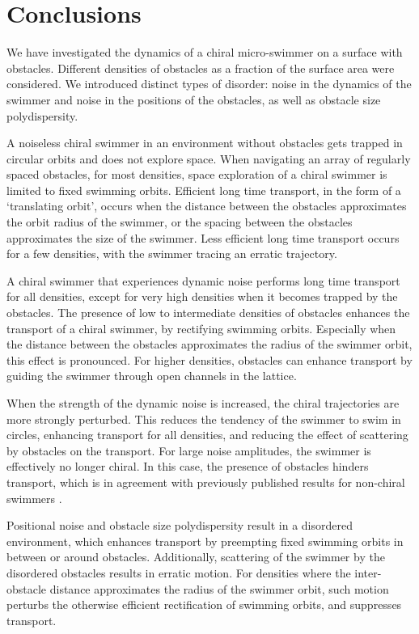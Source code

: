 \documentclass[aps,pre,twocolumn,showpacs,superscriptaddress,amsmath,amssymb,longbibliography]{revtex4-2}
\begin{document}
\section{Conclusions}
We have investigated the dynamics of a chiral micro-swimmer on a surface with obstacles. Different densities of obstacles as a fraction of the surface area were considered. We introduced distinct types of disorder: noise in the dynamics of the swimmer and noise in the positions of the obstacles, as well as obstacle size polydispersity. 

A noiseless chiral swimmer in an environment without obstacles gets trapped in circular orbits and does not explore space. When navigating an array of regularly spaced obstacles, for most densities, space exploration of a chiral swimmer is limited to fixed swimming orbits. Efficient long time transport, in the form of a `translating orbit', occurs when the distance between the obstacles approximates the orbit radius of the swimmer, or the spacing between the obstacles approximates the size of the swimmer. Less efficient long time transport occurs for a few densities, with the swimmer tracing an erratic trajectory.

A chiral swimmer that experiences dynamic noise performs long time transport for all densities, except for very high densities when it becomes trapped by the obstacles. The presence of low to intermediate densities of obstacles enhances the transport of a chiral swimmer, by rectifying swimming orbits. Especially when the distance between the obstacles approximates the radius of the swimmer orbit, this effect is pronounced. For higher densities, obstacles can enhance transport by guiding the swimmer through open channels in the lattice. 

When the strength of the dynamic noise is increased, the chiral trajectories are more strongly perturbed. This reduces the tendency of the swimmer to swim in circles, enhancing transport for all densities, and reducing the effect of scattering by obstacles on the transport. For large noise amplitudes, the swimmer is effectively no longer chiral. In this case, the presence of obstacles hinders transport, which is in agreement with previously published results for non-chiral swimmers \cite{experiments1, lorentzgas}. 

Positional noise and obstacle size polydispersity result in a disordered environment, which enhances transport by preempting fixed swimming orbits in between or around obstacles. Additionally, scattering of the swimmer by the disordered obstacles results in erratic motion. For densities where the inter-obstacle distance approximates the radius of the swimmer orbit, such motion perturbs the otherwise efficient rectification of swimming orbits, and suppresses transport. 
\end{document}
